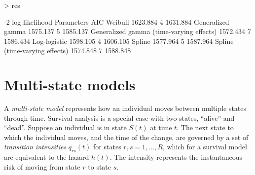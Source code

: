 \documentclass[nojss,nofooter]{jss}
\begin{document}
\begin{Schunk}
\end{Schunk}
\begin{table}[h]
\begin{Schunk}
\begin{Sinput}
> res
\end{Sinput}
\begin{Soutput}
                                         -2 log likelihood Parameters      AIC
Weibull                                           1623.884          4 1631.884
Generalized gamma                                 1575.137          5 1585.137
Generalized gamma (time-varying effects)          1572.434          7 1586.434
Log-logistic                                      1598.105          4 1606.105
Spline                                            1577.964          5 1587.964
Spline (time-varying effects)                     1574.848          7 1588.848
\end{Soutput}
\end{Schunk}
%    
  \caption{Summary of all models fitted to the breast cancer data}
  \label{tab:aic}
\end{table}


\section{Multi-state models}

A \emph{multi-state model} represents how an individual moves between
multiple states through time.  Survival analysis is a special case
with two states, ``alive'' and ``dead''. Suppose an individual is in
state $S(t)$ at time $t$.  The next state to which the individual
moves, and the time of the change, are governed by a set of
\emph{transition intensities} $q_{rs}(t)$ for states $r, s =
1,\dots,R$, which for a survival model are equivalent to the hazard
$h(t)$.  The intensity represents the instantaneous risk of moving
from state $r$ to state $s$.
\end{document}
